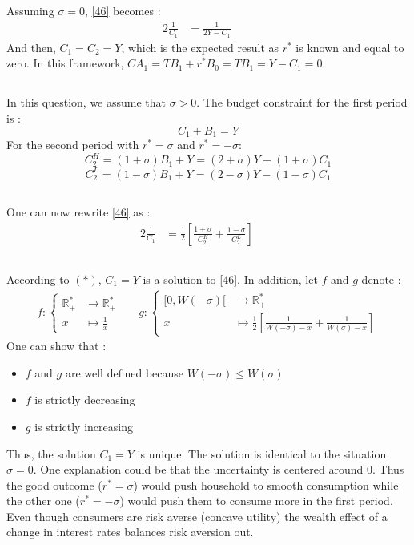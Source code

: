 \documentclass{article}
\begin{document}
\subsection{}
Assuming $\sigma = 0$, \eqref{46} becomes :
\begin{alignat}{2}
    \frac{1}{C_1}  &= \frac{1}{2Y- C_1}   &\quad\
    \label{47}
\end{alignat}
And then, $C_1 = C_2 = Y$, which is the expected result as $r^*$ is known and equal to zero. In this framework, $CA_1 = TB_1 + r^* B_0 = TB_1 = Y - C_1 = 0$.
\subsection{}
In this question, we assume that $\sigma > 0$.\newline 
The budget constraint for the first period is : 
$$C_1 + B_1 = Y$$
For the second period with $r^* = \sigma$ and $r^* = -\sigma$: 
$$C_2^H = (1+\sigma) B_1 + Y = (2+\sigma)Y - (1+\sigma)C_1$$
$$C_2^L = (1-\sigma) B_1 + Y = (2-\sigma)Y - (1-\sigma)C_1$$
\subsection{}
One can now rewrite \eqref{46} as : 
\begin{alignat}{2}
    \frac{1}{C_1}  &= \frac{1}{2}\left[ \frac{1+\sigma}{C_2^H} + \frac{1-\sigma}{C_2^L}  \right]   &\quad\
\end{alignat}
\subsection{}
According to $(*)$, $C_1 = Y$ is a solution to \eqref{46}. \newline
In addition, let $f$ and $g$ denote :
\begin{align}
    f :
    \begin{cases}
        \mathbb{R_+^*} &\to \mathbb{R_+^*} \\
        x &\mapsto \frac{1}{x}
    \end{cases} &&
    g :
    \begin{cases}
        [0, W(-\sigma)[ &\to \mathbb{R_+^*} \\
        x &\mapsto \frac{1}{2}\left[ \frac{1}{W(-\sigma)-x} + \frac{1}{W(\sigma)- x}  \right]
    \end{cases}
\end{align}
One can show that :
\begin{itemize}
    \item $f$ and $g$ are well defined because $W(-\sigma) \leq W(\sigma)$
    \item $f$ is strictly decreasing
    \item $g$ is strictly increasing
\end{itemize}
Thus, the solution $C_1 = Y$ is unique.\newline
The solution is identical to the situation $\sigma = 0$. One explanation could be that the uncertainty is centered around 0. Thus the good outcome ($r^*=\sigma$) would push household to smooth consumption while the other one ($r^*=-\sigma$) would push them to consume more in the first period. Even though consumers are risk averse (concave utility) the wealth effect of a change in interest rates balances risk aversion out.
\end{document}
